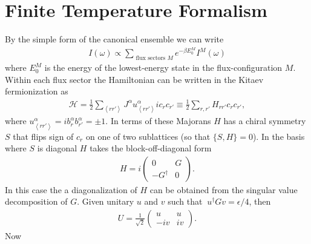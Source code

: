 \documentclass[reprint,amsmath,amssymb,aps,prb,groupedaddress,nofootinbib,superscriptaddress]{revtex4-1}
\newcommand{\1}{\mathds{1}}
\begin{document}
\section{Finite Temperature Formalism} 
By the simple form of the canonical ensemble we can write 
\begin{align}\label{iflux}
I(\omega) \propto \sum_{\text{ flux sectors } M} e^{-\beta E_0^M} I^M(\omega)
\end{align}
where $E_0^M$ is the energy of the lowest-energy state in the flux-configuration $M$. Within each flux sector the Hamiltonian can be written in the Kitaev fermionization %
as
\begin{align}
\mathcal{H} =  \frac{1}{2}\sum_{\left<rr'\right>} J^{\alpha} u^\alpha_{\left<rr'\right>} i c_r c_{r'} \equiv  \frac{1}{2}\sum_{r,r'} H_{rr'} c_r c_{r'},
\end{align}
where $u^\alpha_{\left<rr'\right>} = i b^\alpha_r b^\alpha_{r'} = \pm 1$. 
In terms of these Majorans $H$ has a chiral symmetry $S$ that flips sign of $c_r$ on one of two sublattices (so that $\{S,H\} = 0$). %
In the basis where $S$ is diagonal $H$ takes the block-off-diagonal form
\begin{align}
H = i\left(\begin{array}{cc}
0 & G \\
-G^\dag & 0
\end{array}\right).
\end{align}
In this case the a diagonalization of $H$ can be obtained from the singular value decomposition of $G$. Given unitary $u$ and $v$ %
such that \mbox{$\ u^\dagger G v = \epsilon/4$}, then  %
\begin{align}\label{U}
U = \frac{1}{\sqrt{2}}\left(\begin{array}{cc}
u & u \\
-iv & iv
\end{array}\right).
\end{align}
Now
\end{document}
